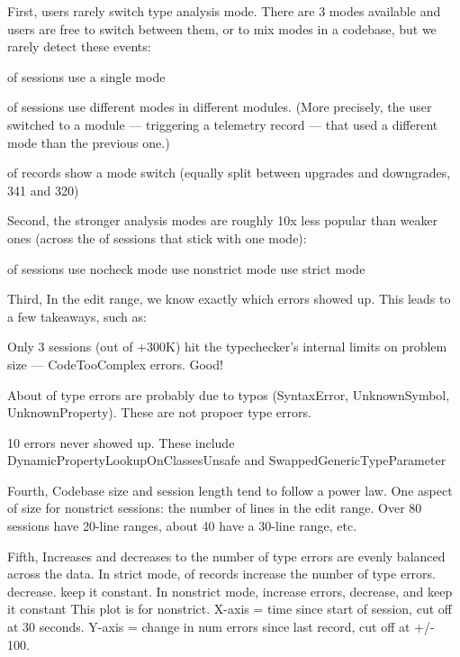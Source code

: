 \documentclass[english,submission,cleveref]{programming}
\begin{document}
First,
users rarely switch type analysis mode. There are 3 modes available and users
are free to switch between them, or to mix modes in a codebase, but we rarely
detect these events:

 of sessions use a single mode

 of sessions use different modes in different modules. (More
precisely, the user switched to a module --- triggering a telemetry record ---
that used a different mode than the previous one.)

 of records show a mode switch (equally split between upgrades and
downgrades, 341 and 320)


Second,
the stronger analysis modes are roughly 10x less popular than weaker ones
(across the  of sessions that stick with one mode):

 of sessions use nocheck mode
 use nonstrict mode
 use strict mode

Third,
In the edit range, we know exactly which errors showed up. This leads to a few
takeaways, such as:

Only 3 sessions (out of +300K) hit the typechecker's internal limits on problem
size --- CodeTooComplex errors. Good!

About  of type errors are probably due to typos (SyntaxError, UnknownSymbol,
UnknownProperty). These are not propoer type errors.

10 errors never showed up. These include DynamicPropertyLookupOnClassesUnsafe and
SwappedGenericTypeParameter


Fourth,
Codebase size and session length tend to follow a power law. 
One aspect of size for nonstrict sessions: the number of
lines in the edit range. Over 80 sessions have 20-line ranges, about 40 have a
30-line range, etc.

Fifth,
Increases and decreases to the number of type errors are evenly balanced across
the data.
In strict mode,  of records increase the number of type errors. 
decrease.  keep it constant.
In nonstrict mode,  increase errors,  decrease, and 
keep it constant
This plot is for nonstrict. X-axis = time since start of session, cut off at 30
seconds. Y-axis = change in num errors since last record, cut off at +/- 100.
\end{document}
